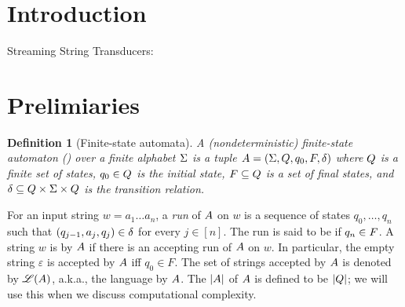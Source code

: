 \documentclass[sigplan,review,anonymous]{acmart}\settopmatter{printfolios=true,printccs=false,printacmref=false}
\newtheorem{definition}{Definition}
\begin{document}




\maketitle


\section{Introduction}

Streaming String Transducers: \cite{FR17}

\section{Prelimiaries}


\begin{definition}[Finite-state automata] \label{def:nfa}
	A \emph{(nondeterministic) finite-state automaton}
	(\FA{}) over a finite alphabet $\Sigma$ is a tuple ${A} =
	(\Sigma, Q, q_0, F, \delta)$ where 
	$Q$ is a finite set of 
	states, $q_0\in Q$ is
	the initial state, $F\subseteq Q$ is a set of final states, and 
	$\delta\subseteq Q \times 
	\Sigma \times  Q$ is the
	transition relation. 
\end{definition}

For an input string $w = a_1 \dots a_n$, a \emph{run} of ${A}$ on $w$
is a sequence of states $q_0,\ldots, q_n$ such that $(q_{j-1}, a_{j}, q_{j}) \in
\delta$  for every $j \in [n]$.
The run is said to be  if $q_n \in F$.
A string $w$ is  by ${A}$ if there is an accepting run of
${A}$ on $w$. In particular, the empty string $\varepsilon$ is accepted by ${A}$ iff $q_0 \in F$. The set of strings accepted by ${A}$ is denoted by $\mathscr{L}({A})$,
a.k.a., the language  by ${A}$.
The  $|{A}|$ of ${A}$ is defined to be $|Q|$; we will
use this when we discuss computational complexity.
\end{document}
